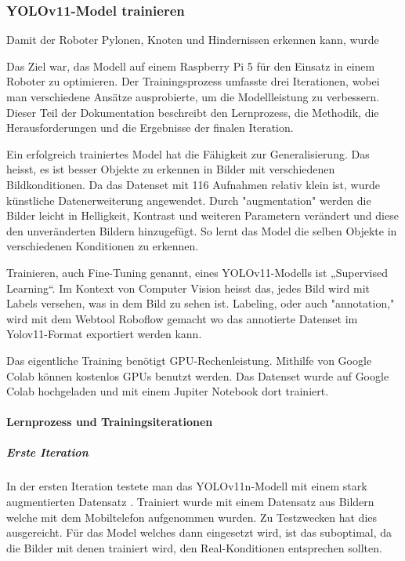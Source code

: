 \subsubsection{YOLOv11-Model trainieren}

Damit der Roboter Pylonen, Knoten und Hindernissen erkennen kann, wurde

Das Ziel war, das Modell auf einem Raspberry Pi 5 für den Einsatz in einem Roboter zu optimieren. Der Trainingsprozess umfasste drei Iterationen, wobei man verschiedene Ansätze ausprobierte, um die Modellleistung zu verbessern. Dieser Teil der Dokumentation beschreibt den Lernprozess, die Methodik, die Herausforderungen und die Ergebnisse der finalen Iteration.

Ein erfolgreich trainiertes Model hat die Fähigkeit zur Generalisierung. Das heisst, es ist besser Objekte zu erkennen in Bilder mit verschiedenen Bildkonditionen. Da das Datenset mit 116 Aufnahmen relativ klein ist, wurde künstliche Datenerweiterung angewendet. Durch "augmentation" werden die Bilder leicht in Helligkeit, Kontrast und weiteren Parametern verändert und diese den unveränderten Bildern hinzugefügt. So lernt das Model die selben Objekte in verschiedenen Konditionen zu erkennen.

Trainieren, auch Fine-Tuning genannt, eines YOLOv11-Modells ist „Supervised Learning“. Im Kontext von Computer Vision heisst das, jedes Bild wird mit Labels versehen, was in dem Bild zu sehen ist. Labeling, oder auch "annotation," wird mit dem Webtool Roboflow gemacht wo das annotierte Datenset im Yolov11-Format exportiert werden kann. 

Das eigentliche Training benötigt GPU-Rechenleistung. Mithilfe von Google Colab können kostenlos GPUs benutzt werden. Das Datenset wurde auf Google Colab hochgeladen und mit einem Jupiter Notebook dort trainiert.

\paragraph{Lernprozess und Trainingsiterationen}

\subparagraph{Erste Iteration}

In der ersten Iteration testete man das YOLOv11n-Modell mit einem stark augmentierten Datensatz . Trainiert wurde mit einem Datensatz aus Bildern welche mit dem Mobiltelefon aufgenommen wurden. Zu Testzwecken hat dies ausgereicht. Für das Model welches dann eingesetzt wird, ist das suboptimal, da die Bilder mit denen trainiert wird, den Real-Konditionen entsprechen sollten.

